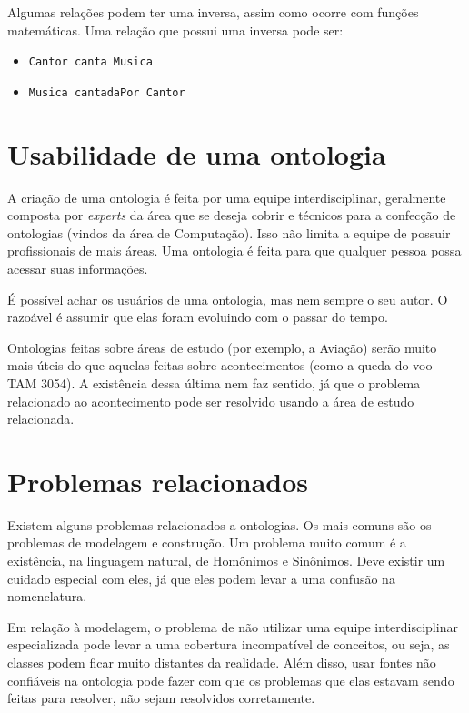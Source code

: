 Algumas relações podem ter uma inversa, assim como ocorre com funções matemáticas. Uma relação que possui uma inversa pode ser:

\begin{itemize}
	\item \texttt{Cantor canta Musica}
	\item \texttt{Musica cantadaPor Cantor}
\end{itemize}

\section{Usabilidade de uma ontologia}

A criação de uma ontologia é feita por uma equipe interdisciplinar, geralmente composta por \textit{experts} da área que se deseja cobrir e técnicos para a confecção de ontologias (vindos da área de Computação). Isso não limita a equipe de possuir profissionais de mais áreas. Uma ontologia é feita para que qualquer pessoa possa acessar suas informações.

É possível achar os usuários de uma ontologia, mas nem sempre o seu autor. O razoável é assumir que elas foram evoluindo com o passar do tempo. 

Ontologias feitas sobre áreas de estudo (por exemplo, a Aviação) serão muito mais úteis do que aquelas feitas sobre acontecimentos (como a queda do voo TAM 3054). A existência dessa última nem faz sentido, já que o problema relacionado ao acontecimento pode ser resolvido usando a área de estudo relacionada.

\section{Problemas relacionados}

Existem alguns problemas relacionados a ontologias. Os mais comuns são os problemas de modelagem e construção. Um problema muito comum é a existência, na linguagem natural, de Homônimos e Sinônimos. Deve existir um cuidado especial com eles, já que eles podem levar a uma confusão na nomenclatura.

Em relação à modelagem, o problema de não utilizar uma equipe interdisciplinar especializada pode levar a uma cobertura incompatível de conceitos, ou seja, as classes podem ficar muito distantes da realidade. Além disso, usar fontes não confiáveis na ontologia pode fazer com que os problemas que elas estavam sendo feitas para resolver, não sejam resolvidos corretamente.

